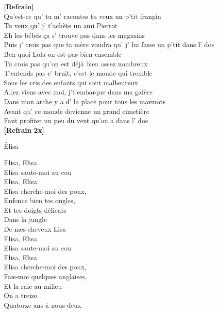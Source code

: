 \documentclass{novel}
\begin{document}
{\begin{minipage}[t][0.4\textheight][t]{\textwidth}
\begin{multicols}{2}
\textbf{[Refrain]} \\

Qu'est-ce qu' tu m' racontes tu veux un p'tit frangin \\
Tu veux qu' j' t'achète un ami Pierrot \\
Eh les bébés ça s' trouve pas dans les magasins \\
Puis j' crois pas que ta mère voudra qu' j' lui fasse un p'tit dans l' dos \\
Ben quoi Lola on est pas bien ensemble \\
Tu crois pas qu'on est déjà bien assez nombreux \\
T'entends pas c' bruit, c'est le monde qui tremble \\
Sous les cris des enfants qui sont malheureux \\
Allez viens avec moi, j't'embarque dans ma galère \\
Dans mon arche y a d' la place pour tous les marmots \\
Avant qu' ce monde devienne un grand cimetière \\
Faut profiter un peu du vent qu'on a dans l' dos \\

\textbf{[Refrain 2x]}

\end{multicols}
\end{minipage}

\vspace{0.09\textheight}
\begin{minipage}[t][0.55\textheight][t]{\textwidth}
\h*{Elisa}
\begin{multicols}{2}
\footnotesize
Elisa, Elisa \\
Elisa saute-moi au cou \\
Elisa, Elisa \\
Elisa cherche-moi des poux, \\
Enfonce bien tes ongles, \\
Et tes doigts délicats \\
Dans la jungle \\
De mes cheveux Lisa \\

Elisa, Elisa \\
Elisa saute-moi au cou \\
Elisa, Elisa \\
Elisa cherche-moi des poux, \\
Fais-moi quelques anglaises, \\
Et la raie au milieu \\
On a treize \\
Quatorze ans à nous deux \\


\end{multicols}
\end{minipage}}
\end{document}
